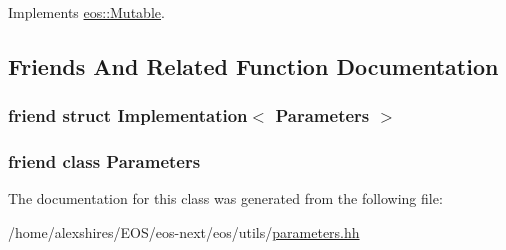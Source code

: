Implements \hyperlink{classeos_1_1Mutable_abf079592435ecb22f242b7b01c279c72}{eos::Mutable}.

\subsection{Friends And Related Function Documentation}
\hypertarget{classeos_1_1Parameter_afdc1ae1c3b0dbac4fdf6769d5f8e1fbf}{
\subsubsection[{Implementation$<$ Parameters $>$}]{\setlength{\rightskip}{0pt plus 5cm}friend struct Implementation$<$ {\bf Parameters} $>$}}
\label{classeos_1_1Parameter_afdc1ae1c3b0dbac4fdf6769d5f8e1fbf}
\hypertarget{classeos_1_1Parameter_afaebbd8ef883afa59f01fa3d4475e6a2}{
\subsubsection[{Parameters}]{\setlength{\rightskip}{0pt plus 5cm}friend class {\bf Parameters}}}
\label{classeos_1_1Parameter_afaebbd8ef883afa59f01fa3d4475e6a2}


The documentation for this class was generated from the following file:\begin{DoxyCompactItemize}
\item 
/home/alexshires/EOS/eos-\/next/eos/utils/\hyperlink{parameters_8hh}{parameters.hh}\end{DoxyCompactItemize}

